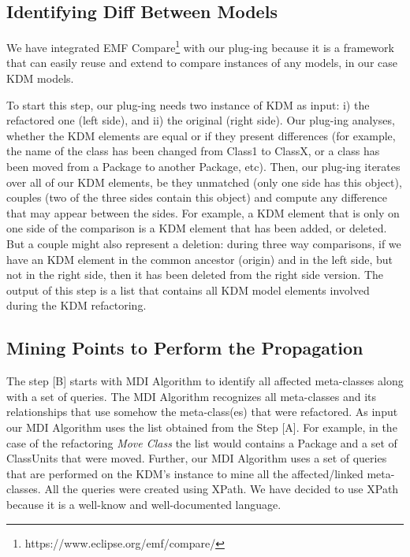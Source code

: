 
\subsection{Identifying Diff Between Models}


We have integrated  EMF Compare\footnote{https://www.eclipse.org/emf/compare/} with our plug-ing because it is a framework that can easily reuse and extend to compare instances of any models, in our case KDM models. %

To start this step, our plug-ing needs two instance of KDM as input: i) the refactored one (left side), and ii) the original (right side). Our plug-ing analyses, whether the KDM elements are equal or if they present differences (for example, the name of the class has been changed from Class1 to ClassX, or a class has been moved from a Package to another Package, etc). Then, our plug-ing iterates over all of our KDM elements, be they unmatched (only one side has this object), couples (two of the three sides contain this object) and compute any difference that may appear between the sides. 
For example, a KDM element that is only on one side of the comparison is a KDM element that has been added, or deleted. But a couple might also represent a deletion: during three way comparisons, if we have an KDM element in the common ancestor (origin) and in the left side, but not in the right side, then it has been deleted from the right side version. The output of this step is a list that contains all KDM model elements involved during the KDM refactoring. 

\subsection{Mining Points to Perform the Propagation} %
\label{sub:mine_affected_metaclasses}

The step [B] starts with MDI Algorithm to identify all affected meta-classes along with a set of queries. The MDI Algorithm recognizes all meta-classes and its relationships that use somehow the meta-class(es) that were refactored. As input our MDI Algorithm uses the list obtained from the Step [A]. For example, in the case of the refactoring \textit{Move Class} the list would contains a Package and a set of ClassUnits that were moved. Further, our MDI Algorithm uses a set of queries that are performed on the KDM's instance to mine all the affected/linked meta-classes. All the queries were created using XPath. We have decided to use XPath because it is a well-know and well-documented language. 

